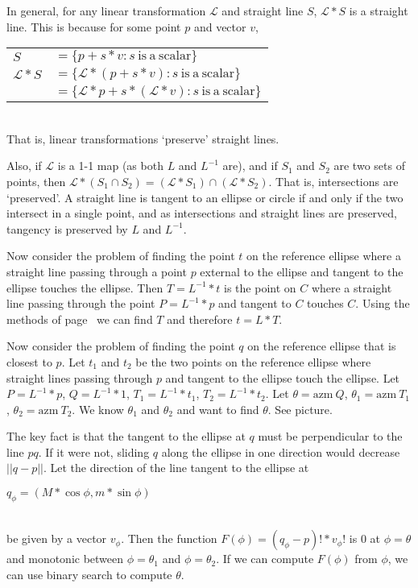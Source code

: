 \documentclass[12pt]{article}
\begin{document}
In general, for any linear transformation $\mathcal{L}$ and straight line
$S$, $\mathcal{L}*S$ is a straight line.  This is because for some point
$p$ and vector $v$, \\
\hspace*{0.5in}\begin{tabular}{ll}
$S$ & $= \{ p+s*v : s~\mathrm{is~a~scalar}\}$ \\
$\mathcal{L}*S$
    & $= \{ \mathcal{L}*(p+s*v) : s~\mathrm{is~a~scalar}\}$ \\
    & $= \{ \mathcal{L}*p+s*(\mathcal{L}*v) : s~\mathrm{is~a~scalar}\}$ \\
\end{tabular} \\
That is, linear transformations `preserve' straight lines.

Also, if $\mathcal{L}$ is a 1-1 map (as both $L$ and $L^{-1}$ are),
and if $S_1$ and $S_2$ are two sets of points, then
$\mathcal{L}*(S_1\cap S_2) = (\mathcal{L}*S_1)\cap(\mathcal{L}*S_2)$.
That is, intersections are `preserved'.  A straight line is tangent
to an ellipse or circle if and only if the two intersect in a single
point, and as intersections and straight lines are preserved, tangency
is preserved by $L$ and $L^{-1}$.

Now consider the problem of finding the point $t$ on the reference ellipse
where a straight line passing through a point $p$ external to the
ellipse and tangent to the ellipse touches the ellipse.  Then
$T=L^{-1}*t$ is the point on $C$ where a straight line passing through
the point $P=L^{-1}*p$ and tangent to $C$ touches $C$.  Using the
methods of page~\pageref{FINDING-TANGENT-POINT} we can find $T$ and
therefore $t=L*T$.

Now consider the problem of finding the point $q$ on the reference ellipse
that is closest to $p$.  Let $t_1$ and $t_2$ be the two points on the
reference ellipse where straight lines passing through $p$ and tangent
to the ellipse touch the ellipse.  Let $P=L^{-1}*p$, $Q=L^{-1}*1$,
$T_1=L^{-1}*t_1$, $T_2=L^{-1}*t_2$.
Let $\theta=\mathrm{azm}~Q$,
$\theta_1=\mathrm{azm}~T_1$,
$\theta_2=\mathrm{azm}~T_2$.
We know $\theta_1$ and $\theta_2$ and want to find $\theta$.
See picture.

The key fact is that the tangent to the ellipse at $q$ must be perpendicular
to the line $pq$.  If it were not, sliding $q$ along the ellipse in one
direction would decrease $||q-p||$.  Let the direction of the line tangent
to the ellipse at \\
\centerline{$q_\phi = (M*\cos\phi,m*\sin\phi)$} \\
be given by a vector $v_\phi$.
Then the function $F(\phi)=(q_\phi-p)!*v_\phi!$ is $0$ at $\phi=\theta$
and monotonic between $\phi=\theta_1$ and $\phi=\theta_2$.  If we can compute
$F(\phi)$ from $\phi$, we can use binary search to compute $\theta$.
\end{document}
